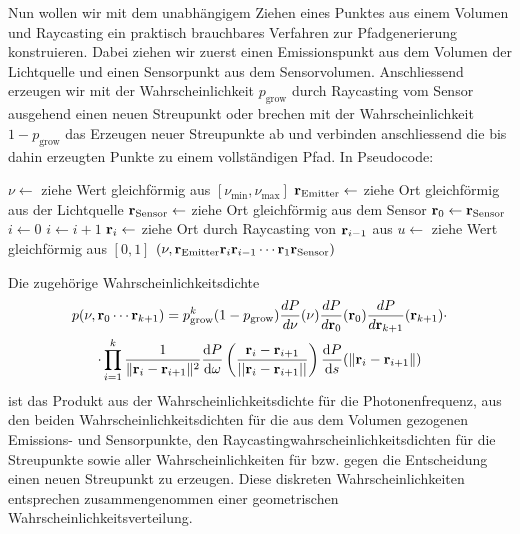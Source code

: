 	Nun wollen wir mit dem unabhängigem Ziehen eines Punktes aus einem Volumen und Raycasting ein praktisch brauchbares Verfahren zur Pfadgenerierung konstruieren. Dabei ziehen wir zuerst einen Emissionspunkt aus dem Volumen der Lichtquelle und einen Sensorpunkt aus dem Sensorvolumen. Anschliessend erzeugen wir mit der Wahrscheinlichkeit $p_\text{grow}$ durch Raycasting vom Sensor ausgehend einen neuen Streupunkt oder brechen mit der Wahrscheinlichkeit $1-p_\text{grow}$ das Erzeugen neuer Streupunkte ab und verbinden anschliessend die bis dahin erzeugten Punkte zu einem vollständigen Pfad. In Pseudocode:
	
	\begin{algorithmic}
		\STATE $\nu \leftarrow$ ziehe Wert gleichförmig aus $[\nu_\text{min},\nu_\text{max}]$
		\STATE $\mathbf{r}_\text{Emitter} \leftarrow$ ziehe Ort gleichförmig aus der Lichtquelle
		\STATE $\mathbf{r}_\text{Sensor} \leftarrow$ ziehe Ort gleichförmig aus dem Sensor
		\STATE $\mathbf{r}_0 \leftarrow \mathbf{r}_\text{Sensor}$
		\STATE $i \leftarrow 0$
		\REPEAT
			\STATE $i \leftarrow i+1$
			\STATE $\mathbf{r}_i \leftarrow$ ziehe Ort durch Raycasting von $\mathbf{r}_{i-1}$ aus
			\STATE $u \leftarrow$ ziehe Wert gleichförmig aus $[0,1]$
	  \RETURN $(\nu,\mathbf{r}_\text{Emitter}\mathbf{r}_i\mathbf{r}_{i-1}\cdots\mathbf{r}_1\mathbf{r}_\text{Sensor})$
	\end{algorithmic}
	
	Die zugehörige Wahrscheinlichkeitsdichte
	\begin{multline*}
		p(\nu,\mathbf{r}_0\cdots\mathbf{r}_{k+1})=p_\text{grow}^k(1-p_\text{grow})\frac{dP}{d\nu}(\nu)\frac{dP}{d\mathbf{r}_0}(\mathbf{r}_0)\frac{dP}{d\mathbf{r}_{k+1}}(\mathbf{r}_{k+1}) \cdot \\
	\cdot \prod_{i=1}^k \frac{1}{\|\mathbf{r}_i - \mathbf{r}_{i+1}\|^2} \frac{\text{d}P}{\text{d}\omega}\left(\frac{\mathbf{r}_i - \mathbf{r}_{i+1}}{||\mathbf{r}_i - \mathbf{r}_{i+1}||}\right) \frac{\text{d}P}{\text{d}s}(\|\mathbf{r}_i-\mathbf{r}_{i+1}\|)
	\end{multline*}
	ist das Produkt aus der Wahrscheinlichkeitsdichte für die Photonenfrequenz, aus den beiden Wahrscheinlichkeitsdichten für die aus dem Volumen gezogenen Emissions- und Sensorpunkte, den Ray\-casting\-wahr\-schein\-lich\-keits\-dich\-ten für die Streupunkte sowie aller Wahrscheinlichkeiten für bzw. gegen die Entscheidung einen neuen Streupunkt zu erzeugen. Diese diskreten Wahrscheinlichkeiten entsprechen zusammengenommen einer geometrischen Wahrscheinlichkeitsverteilung.
	
